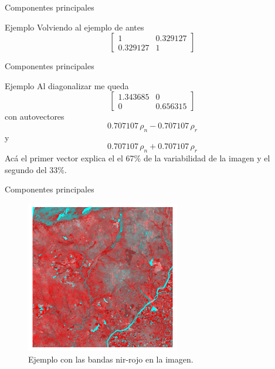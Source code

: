 \documentclass[handout]{beamer}
\begin{document}
\begin{frame}{Componentes principales}
  \begin{exampleblock}{Ejemplo}
    Volviendo al ejemplo de antes
    \[
    \begin{bmatrix}
        1       & 0.329127 \\
        0.329127 & 1
    \end{bmatrix} \]
  \end{exampleblock}
\end{frame}

\begin{frame}{Componentes principales}
  \begin{exampleblock}{Ejemplo}
    Al diagonalizar me queda
    \[
    \begin{bmatrix}
        1.343685       & 0 \\
        0       & 0.656315
    \end{bmatrix} \]
    con autovectores $$0.707107\, \rho_n-0.707107 \, \rho_r$$  y $$0.707107 \,
      \rho_n+0.707107\, \rho_r$$ \pause\@
    Acá el primer vector explica el el 67\% de la variabilidad de la imagen y el segundo del 33\%.
  \end{exampleblock}
\end{frame}

\begin{frame}{Componentes principales}
  \begin{figure}
  \centering
  \includegraphics[width=0.6\textwidth]{imagenes/pca1.png}
  \caption{Ejemplo con las bandas nir-rojo en la imagen.}
  \end{figure}
\end{frame}
\end{document}
